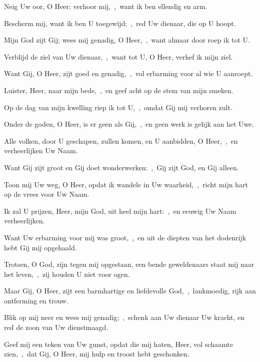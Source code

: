 \documentclass[12pt,twoside,a5paper]{article}
\begin{document}


\begin{halfparskip}
  Neig Uw oor, O Heer; verhoor mij,~\sep\ want ik ben ellendig en arm.


  Bescherm mij, want ik ben U toegewijd;~\sep\ red Uw dienaar, die op U hoopt.

  Mijn God zijt Gij; wees mij genadig, O Heer,~\sep\ want almaar door roep ik tot U.

  Verblijd de ziel van Uw dienaar,~\sep\ want tot U, O Heer, verhef ik mijn ziel.

  Want Gij, O Heer, zijt goed en genadig,~\sep\ vol erbarming voor al wie U aanroept.

  Luister, Heer, naar mijn bede,~\sep\ en geef acht op de stem van mijn smeken.

  Op de dag van mijn kwelling riep ik tot U,~\sep\ omdat Gij mij verhoren zult.
\end{halfparskip}


\begin{halfparskip}
  Onder de goden, O Heer, is er geen als Gij,~\sep\ en geen werk is gelijk aan het Uwe.

  Alle volken, door U geschapen, zullen komen, en U aanbidden, O Heer,~\sep\ en verheerlijken Uw Naam.

  Want Gij zijt groot en Gij doet wonderwerken:~\sep\ Gij zijt God, en Gij alleen.
\end{halfparskip}


\begin{halfparskip}
  Toon mij Uw weg, O Heer, opdat ik wandele in Uw waarheid,~\sep\ richt mijn hart op de vrees voor Uw Naam.

  Ik zal U prijzen, Heer, mijn God, uit heel mijn hart:~\sep\ en eeuwig Uw Naam verheerlijken.

  Want Uw erbarming voor mij was groot,~\sep\ en uit de diepten van het dodenrijk hebt Gij mij opgehaald.

  Trotsen, O God, zijn tegen mij opgestaan, een bende geweldenaars staat mij naar het leven,~\sep\ zij houden U niet voor ogen.

  Maar Gij, O Heer, zijt een barmhartige en liefdevolle God,~\sep\ lankmoedig, rijk aan ontferming en trouw.

  Blik op mij neer en wees mij genadig;~\sep\ schenk aan Uw dienaar Uw kracht, en red de zoon van Uw dienstmaagd.

  Geef mij een teken van Uw gunst, opdat die mij haten, Heer, vol schaamte zien,~\sep\ dat Gij, O Heer, mij hulp en troost hebt geschonken.
\end{halfparskip}
\end{document}
